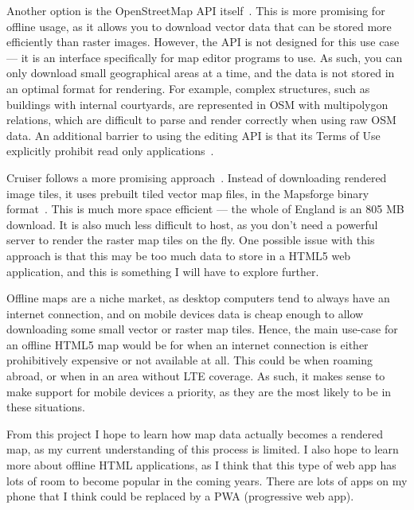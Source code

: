 Another option is the OpenStreetMap API itself~\cite{osm-api-wiki}. This is more promising for offline usage, as it allows you to download vector data that can be stored more efficiently than raster images. However, the API is not designed for this use case --- it is an interface specifically for map editor programs to use. As such, you can only download small geographical areas at a time, and the data is not stored in an optimal format for rendering. For example, complex structures, such as buildings with internal courtyards, are represented in OSM with multipolygon relations, which are difficult to parse and render correctly when using raw OSM data. An additional barrier to using the editing API is that its Terms of Use explicitly prohibit read only applications~\cite{OSM-editing-API-usage-policy}.

Cruiser follows a more promising approach~\cite{cruiser}. Instead of downloading rendered image tiles, it uses prebuilt tiled vector map files, in the Mapsforge binary format~\cite{mapsforge-format}. This is much more space efficient --- the whole of England is an 805 MB download. It is also much less difficult to host, as you don't need a powerful server to render the raster map tiles on the fly. One possible issue with this approach is that this may be too much data to store in a HTML5 web application, and this is something I will have to explore further.

Offline maps are a niche market, as desktop computers tend to always have an internet connection, and on mobile devices data is cheap enough to allow downloading some small vector or raster map tiles. Hence, the main use-case for an offline HTML5 map would be for when an internet connection is either prohibitively expensive or not available at all. This could be when roaming abroad, or when in an area without LTE coverage. As such, it makes sense to make support for mobile devices a priority, as they are the most likely to be in these situations.

From this project I hope to learn how map data actually becomes a rendered map, as my current understanding of this process is limited. I also hope to learn more about offline HTML applications, as I think that this type of web app has lots of room to become popular in the coming years. There are lots of apps on my phone that I think could be replaced by a PWA (progressive web app).
